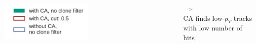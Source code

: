 \documentclass[18pt, aspectratio=169]{beamer}
\begin{document}
\begin{frame}
\begin{columns}
\begin{column}{.5\textwidth}
    \end{column}
  \end{columns}
  \begin{columns}
    \begin{column}{.5\textwidth}
      \includegraphics[width=0.5\textwidth]{figures/legend_rejected_vs_other_track_distributions.pdf}
    \end{column}
    \begin{column}{.5\textwidth}
      $\Rightarrow$\\CA finds low-$p_T$ tracks with low number of hits      
    \end{column}
  \end{columns}
\end{frame}
\end{document}
